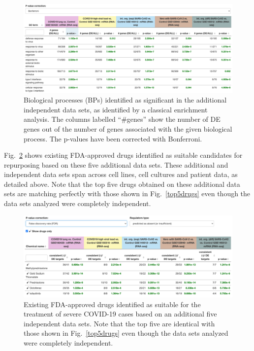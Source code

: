 \begin{figure}
\centering
	\includegraphics[width=1\linewidth]{../Figures/BPs_in_common_(Bonferroni)_in_additional_datasets.png}
    \caption{Biological processes (BPs) identified as significant in the additional independent data sets, as identified by a classical enrichment analysis. The  columns labelled ``\#genes'' show the number of DE genes out of the number of genes associated with the given biological process. The p-values have been corrected with Bonferroni. }
        \label{Supp:BPs_validation} 
\end{figure}

Fig.~\ref{Supp:drugs_validation} shows existing FDA-approved drugs identified as suitable candidates for repurposing based on these five additional data sets. These additional and independent data sets span across cell lines, cell cultures and patient data, as detailed above. Note that the top five drugs obtained on these additional data sets are matching perfectly with those shown in Fig.~\ref{top5drugs} even though the data sets analyzed were completely independent.

\begin{figure}
\centering
	\includegraphics[width=1\linewidth]{../Figures/drugs_in_common_(Bonf)_validation.png}
    \caption{Existing FDA-approved drugs identified as suitable for the treatment of severe COVID-19 cases based on an additional five independent data sets. Note that the top five are identical with those shown in Fig.~\ref{top5drugs} even though the data sets analyzed were completely independent.}
        \label{Supp:drugs_validation}
\end{figure}


